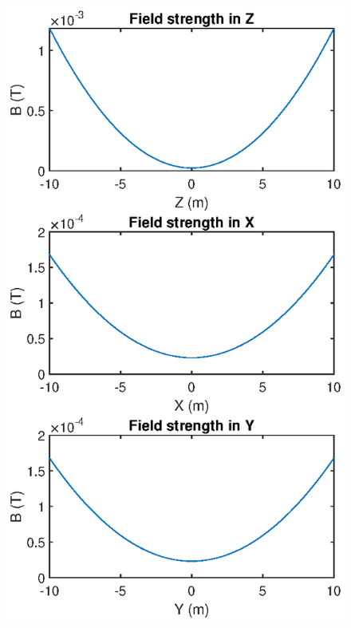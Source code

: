 \documentclass{book}
\theoremstyle{definition}
\begin{document}
\begin{figure}[!htb]
\begin{minipage}{.49\textwidth}
	\end{minipage}%
	\begin{minipage}{.49\textwidth}
		\centering
		\includegraphics[width=\linewidth]{sim-figs/TOP-2.eps}
	\end{minipage}%
\end{figure}
\end{document}
